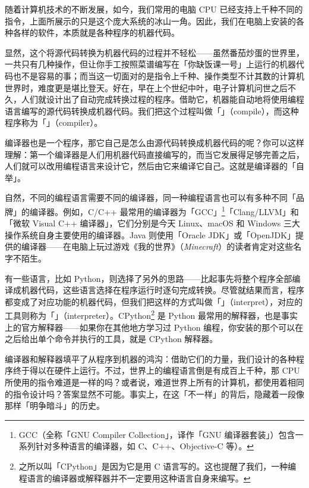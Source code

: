 随着计算机技术的不断发展，如今，我们常用的电脑 CPU 已经支持上千种不同的指令，上面所展示的只是这个庞大系统的冰山一角。因此，我们在电脑上安装的各种各样的软件，本质就是各种程序的机器代码。

显然，这个将源代码转换为机器代码的过程并不轻松——虽然番茄炒蛋的世界里，一共只有几种操作，但让你手工按照菜谱编写在「你缺饭课一号」上运行的机器代码也不是容易的事；而当这一切面对的是指令上千种、操作类型不计其数的计算机世界时，难度更是堪比登天。好在，早在上个世纪中叶，电子计算机问世之后不久，人们就设计出了自动完成转换过程的程序。借助它，机器能自动地将使用编程语言编写的源代码转换成机器代码。我们把这个过程叫做「」（compile），而这种程序称为「」（compiler）。

\begin{note}
  编译器也是一个程序，那它自己是怎么由源代码转换成机器代码的呢？你可以这样理解：第一个编译器是人们用机器代码直接编写的，而当它发展得足够完善之后，人们就可以改用编程语言来设计它，然后由它来编译它自己。这就是编译器的「自举」。
\end{note}

自然，不同的编程语言需要不同的编译器，同一种编程语言也可以有多种不同「品牌」的编译器。例如，C/C++ 最常用的编译器为「GCC」\footnote{GCC（全称「GNU Compiler Collection」，译作「GNU 编译器套装」）包含一系列针对多种语言的编译器，如 C、C++、Objective-C 等）。}「Clang/LLVM」和「微软 Visual C++ 编译器」，它们分别是今天 Linux、macOS 和 Windows 三大操作系统自身主要使用的编译器。Java 则使用「Oracle JDK」或「OpenJDK」提供的编译器——在电脑上玩过游戏《我的世界》（\textit{Minecraft}）的读者肯定对这些名字不陌生。

有一些语言，比如 Python，则选择了另外的思路——比起事先将整个程序全部编译成机器代码，这些语言选择在程序运行时逐句完成转换。尽管就结果而言，程序都变成了对应功能的机器代码，但我们把这样的方式叫做「」（interpret），对应的工具则称为「」（interpreter）。CPython\footnote{之所以叫「CPython」是因为它是用 C 语言写的。这也提醒了我们，一种编程语言的编译器或解释器并不一定要用这种语言自身来编写。} 是 Python 最常用的解释器，也是事实上的官方解释器——如果你在其他地方学习过 Python 编程，你安装的那个可以在 \MissingVerb{>>>} 之后给出单个命令并执行的工具，就是 CPython 解释器。

编译器和解释器填平了从程序到机器的鸿沟：借助它们的力量，我们设计的各种程序终于得以在硬件上运行。不过，世界上的编程语言倒是有成百上千种，那 CPU 所使用的指令难道是一样的吗？或者说，难道世界上所有的计算机，都使用着相同的指令设计吗？答案显然不可能。事实上，在这「不一样」的背后，隐藏着一段像\hyperref[cha:browsers-and-how-to-choose]{}那样「明争暗斗」的历史。

